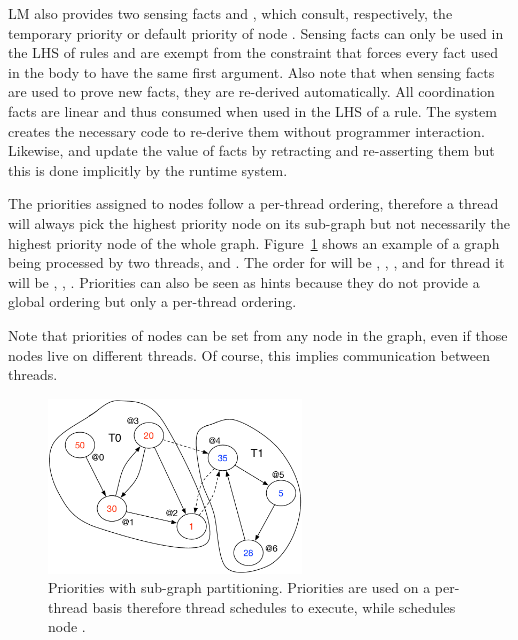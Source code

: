 LM also provides two sensing facts  and
, which consult, respectively, the
temporary priority or default priority  of node .  Sensing facts
can only be used in the LHS of rules and are exempt from the constraint that
forces every fact used in the body to have the same first argument. Also note
that when sensing facts are used to prove new facts, they are re-derived
automatically. All coordination facts are linear and thus consumed when used in
the LHS of a rule.  The system creates the necessary code to re-derive them
without programmer interaction. Likewise,  and
 update the value of  facts by
retracting and re-asserting them but this is done implicitly by the runtime
system.

The priorities assigned to nodes follow a per-thread ordering, therefore a
thread will always pick the highest priority node on its sub-graph but not
necessarily the highest priority node of the whole graph.
Figure~\ref{fig:coordination:priorities} shows an example of a graph being
processed by two threads,  and . The order for  will
be , , ,  and for thread  it will
be , , . Priorities can also be seen as hints because
they do not provide a global ordering but only a per-thread ordering.

Note that priorities of nodes can be set from any node in the graph, even if those nodes
live on different threads. Of course, this implies communication between
threads.

\begin{figure}
\begin{center}
   \includegraphics[width=0.6\textwidth]{figures/coordination/priorities.pdf}
\end{center}
\caption{Priorities with sub-graph partitioning. Priorities are used on a
   per-thread basis therefore thread  schedules  to
   execute, while  schedules node .}
\label{fig:coordination:priorities}
\end{figure}
